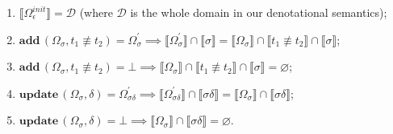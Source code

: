\documentclass[submission,copyright,creativecommons]{eptcs}
\newtheorem{theorem}{Theorem}
\newcommand{\sembr}[1]{\llbracket{#1}\rrbracket}
\newcommand{\diseq}{\not\equiv}
\newcommand{\reprfunset}{\mathcal{D}}
\newcommand{\cstore}{\Omega}
\newcommand{\cstoreinit}{\cstore_\epsilon^{init}}
\newcommand{\csadd}[3]{\mathbf{add}\,(#1, #2 \diseq #3)}  %
\newcommand{\csupdate}[2]{\mathbf{update}\,(#1, #2)}  %
\let\emptyset\varnothing
\begin{document}




\begin{enumerate}
\item $\sembr{\cstoreinit} = \reprfunset$ (where $\reprfunset$ is the whole domain in our denotational semantics);
\item $\csadd{\cstore_\sigma}{t_1}{t_2} = \cstore^\prime_\sigma \implies \sembr{\cstore^\prime_\sigma} \cap \sembr{\sigma} = \sembr{\cstore_\sigma} \cap \sembr{t_1 \diseq t_2} \cap \sembr{\sigma}$;
\item $\csadd{\cstore_\sigma}{t_1}{t_2} = \bot \implies \sembr{\cstore_\sigma} \cap \sembr{t_1 \diseq t_2} \cap \sembr{\sigma} = \emptyset$;
\item $\csupdate{\cstore_\sigma}{\delta} = \cstore^\prime_{\sigma \delta} \implies \sembr{\cstore^\prime_{\sigma \delta}} \cap \sembr{\sigma \delta} = \sembr{\cstore_\sigma} \cap \sembr{\sigma \delta}$;
\item $\csupdate{\cstore_\sigma}{\delta} = \bot \implies \sembr{\cstore_\sigma} \cap \sembr{\sigma \delta} = \emptyset$.
\end{enumerate}
\end{document}
